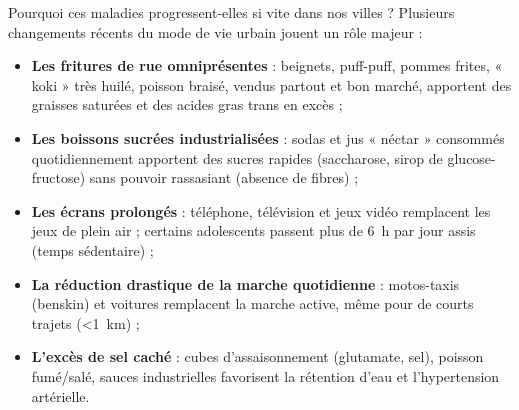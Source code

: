 \documentclass[11pt]{article}
\begin{document}
Pourquoi ces maladies progressent-elles si vite dans nos villes ? Plusieurs changements récents du mode de vie urbain jouent un rôle majeur :
\begin{itemize}
\item \textbf{Les fritures de rue omniprésentes} : beignets, puff-puff, pommes frites, « koki » très huilé, poisson braisé, vendus partout et bon marché, apportent des graisses saturées et des acides gras trans en excès ;
\item \textbf{Les boissons sucrées industrialisées} : sodas et jus « néctar » consommés quotidiennement apportent des sucres rapides (saccharose, sirop de glucose-fructose) sans pouvoir rassasiant (absence de fibres) ;
\item \textbf{Les écrans prolongés} : téléphone, télévision et jeux vidéo remplacent les jeux de plein air ; certains adolescents passent plus de \SI{6}{h} par jour assis (temps sédentaire) ;
\item \textbf{La réduction drastique de la marche quotidienne} : motos-taxis (benskin) et voitures remplacent la marche active, même pour de courts trajets (\textless \SI{1}{km}) ;
\item \textbf{L'excès de sel caché} : cubes d'assaisonnement (glutamate, sel), poisson fumé/salé, sauces industrielles favorisent la rétention d'eau et l'hypertension artérielle.
\end{itemize}
\end{document}
